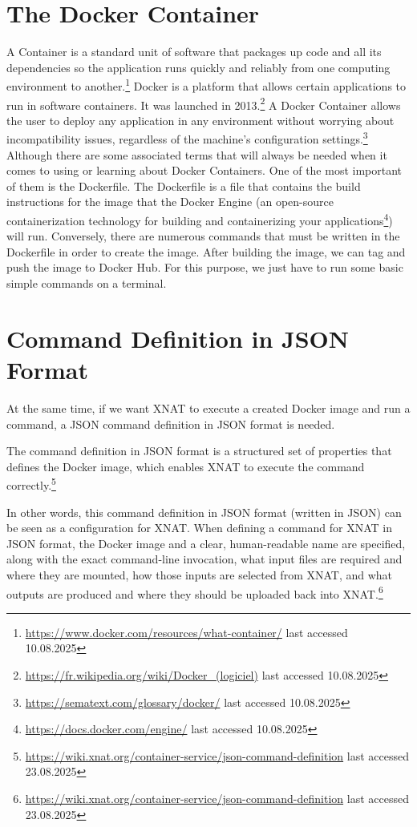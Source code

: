 \section{The Docker Container}
A Container is a standard unit of software that packages up code and all its dependencies so the application runs quickly and reliably from one computing environment to another.\footnote{\url{https://www.docker.com/resources/what-container/} { last accessed 10.08.2025}}
Docker is a platform that allows certain applications to run in software containers. It was launched in 2013.\footnote{\url{https://fr.wikipedia.org/wiki/Docker\_(logiciel)} { last accessed 10.08.2025}} A Docker Container allows the user to deploy any application in any environment without worrying about incompatibility issues, regardless of the machine’s configuration settings.\footnote{\url{https://sematext.com/glossary/docker/} {last accessed 10.08.2025}} Although there are some associated terms that will always be needed when it comes to using or learning about Docker Containers.
One of the most important of them is the Dockerfile. The Dockerfile is a file that contains the build instructions for the image that the Docker Engine (an open-source containerization technology for building and containerizing your applications\footnote{\url{https://docs.docker.com/engine/} { last accessed 10.08.2025}}) will run. Conversely, there are numerous commands that must be written in the Dockerfile in order to create the image. After building the image, we can tag and push the image to Docker Hub. For this purpose, we just have to run some basic simple commands on a terminal.
\\
\section{Command Definition in JSON Format}
At the same time, if we want XNAT to execute a created Docker image and run a command, a \ac{JSON} command definition in JSON format is needed. 

The command definition in JSON format is a structured set of properties that defines the Docker image, which enables XNAT to execute the command correctly.\footnote{\url{https://wiki.xnat.org/container-service/json-command-definition}{ last accessed 23.08.2025}}

In other words, this command definition in JSON format (written in JSON) can be seen as a configuration for XNAT. When defining a command for XNAT in JSON format, the Docker image and a clear, human-readable name are specified, along with the exact command-line invocation, what input files are required and where they are mounted, how those inputs are selected from XNAT, and what outputs are produced and where they should be uploaded back into XNAT.\footnote{\url{https://wiki.xnat.org/container-service/json-command-definition} { last accessed 23.08.2025}}
